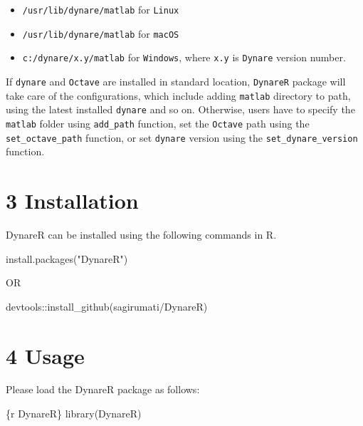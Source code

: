 \documentclass[
  12pt,
  legalpaperpaper,
  DIV=11,
  numbers=noendperiod]{scrartcl}
\newenvironment{Shaded}{\begin{snugshade}}{\end{snugshade}}
\newcommand{\FunctionTok}[1]{\textcolor[rgb]{0.28,0.35,0.67}{#1}}
\newcommand{\InformationTok}[1]{\textcolor[rgb]{0.37,0.37,0.37}{#1}}
\newcommand{\NormalTok}[1]{\textcolor[rgb]{0.00,0.23,0.31}{#1}}
\newcommand{\SpecialCharTok}[1]{\textcolor[rgb]{0.37,0.37,0.37}{#1}}
\newcommand{\StringTok}[1]{\textcolor[rgb]{0.13,0.47,0.30}{#1}}
\begin{document}
\begin{itemize}
\item
  \texttt{/usr/lib/dynare/matlab} for \texttt{Linux}
\item
  \texttt{/usr/lib/dynare/matlab} for \texttt{macOS}
\item
  \texttt{c:/dynare/x.y/matlab} for \texttt{Windows}, where \texttt{x.y}
  is \texttt{Dynare} version number.
\end{itemize}

If \texttt{dynare} and \texttt{Octave} are installed in standard
location, \texttt{DynareR} package will take care of the configurations,
which include adding \texttt{matlab} directory to path, using the latest
installed \texttt{dynare} and so on. Otherwise, users have to specify
the \texttt{matlab} folder using \texttt{add\_path} function, set the
\texttt{Octave} path using the \texttt{set\_octave\_path} function, or
set \texttt{dynare} version using the \texttt{set\_dynare\_version}
function.

\hypertarget{installation}{%
\section{3 Installation}\label{installation}}

DynareR can be installed using the following commands in R.

\begin{Shaded}
\begin{Highlighting}[]
\FunctionTok{install.packages}\NormalTok{(}\StringTok{"DynareR"}\NormalTok{)}

\NormalTok{          OR}
          
\NormalTok{devtools}\SpecialCharTok{::}\FunctionTok{install\_github}\NormalTok{(}\StringTok{\textquotesingle{}sagirumati/DynareR\textquotesingle{}}\NormalTok{)}
\end{Highlighting}
\end{Shaded}

\hypertarget{usage}{%
\section{4 Usage}\label{usage}}

Please load the DynareR package as follows:

\begin{Shaded}
\begin{Highlighting}[]
\InformationTok{\textasciigrave{}\textasciigrave{}\textasciigrave{}\{r DynareR\}}
\FunctionTok{library}\NormalTok{(DynareR)}
\InformationTok{\textasciigrave{}\textasciigrave{}\textasciigrave{}}
\end{Highlighting}
\end{Shaded}
\end{document}
